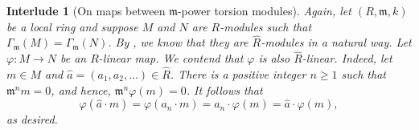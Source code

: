 \documentclass[10pt]{article}
\theoremstyle{thmstyle}
\theoremstyle{defstyle}
\newtheorem{interlude}[theorem]{Interlude}
\newcommand{\frakm}{\mathfrak{m}} %
\newcommand{\wh}[1]{\widehat{#1}}
\renewcommand{\ge}{\geqslant}
\begin{document}
\begin{interlude}[On maps between $\frakm$-power torsion modules]
    Again, let $(R,\frakm, k)$ be a local ring and suppose $M$ and $N$ are $R$-modules such that $\Gamma_\frakm(M) = \Gamma_\frakm(N)$. By , we know that they are $\wh R$-modules in a natural way. Let $\varphi: M\to N$ be an $R$-linear map. We contend that $\varphi$ is also $\wh R$-linear. Indeed, let $m\in M$ and $\wh a = (a_1, a_2, \dots)\in\wh R$. There is a positive integer $n\ge 1$ such that $\frakm^n m = 0$, and hence, $\frakm^n\varphi(m) = 0$. It follows that 
    \begin{equation*}
        \varphi(\wh a\cdot m) = \varphi(a_n\cdot m) = a_n\cdot\varphi(m) = \wh a\cdot\varphi(m),
    \end{equation*}
    as desired.
\end{interlude}
\end{document}
